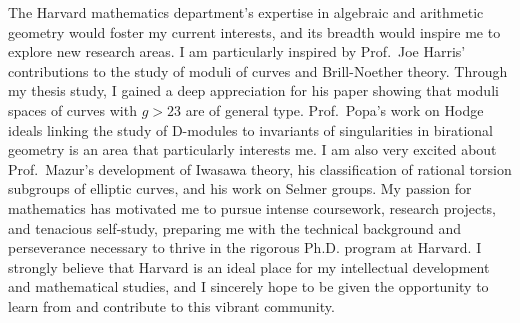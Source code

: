 \documentclass[11pt]{article}
\begin{document}
\par
The Harvard mathematics department's expertise in algebraic and arithmetic geometry would foster my current interests, and its breadth would inspire me to explore new research areas. I am particularly inspired by Prof.\ Joe Harris’ contributions to the study of moduli of curves and Brill-Noether theory. Through my thesis study, I gained a deep appreciation for his paper showing that moduli spaces of curves with $g > 23$ are of general type. Prof.\ Popa’s work on Hodge ideals linking the study of D-modules to invariants of singularities in birational geometry is an area that particularly interests me. I am also very excited about Prof.\ Mazur’s development of Iwasawa theory, his classification of rational torsion subgroups of elliptic curves, and his work on Selmer groups. My passion for mathematics has motivated me to pursue intense coursework, research projects, and tenacious self-study, preparing me with the technical background and perseverance necessary to thrive in the rigorous Ph.D. program at Harvard. I strongly believe that Harvard is an ideal place for my intellectual development and mathematical studies, and I sincerely hope to be given the opportunity to learn from and contribute to this vibrant community.
\end{document}
